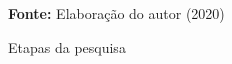 \begin{figure}[ht!]
\centering

\caption{\textmd{Etapas da pesquisa}}
\label{fig:etapas}

\par\medskip\textbf{Fonte:} Elaboração do autor (2020) \par\medskip

\end{figure}
